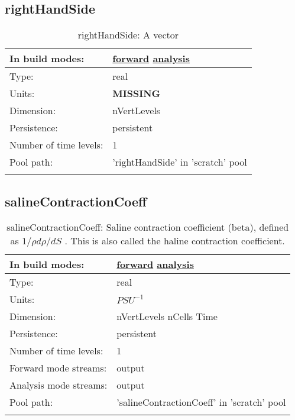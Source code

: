 \subsection[rightHandSide]{rightHandSide}
\label{subsec:var_sec_scratch_rightHandSide}
\begin{center}
\begin{longtable}{| p{2.0in} | p{4.0in} |}
        \hline 
        In build modes: & \hyperref[subsec:forward_var_tab_scratch]{forward} \hyperref[subsec:analysis_var_tab_scratch]{analysis} \\
        \hline 
        Type: & real \\
        \hline 
        Units: & {\bf \color{red} MISSING} \\
        \hline 
        Dimension: & nVertLevels \\
        \hline 
        Persistence: & persistent \\
        \hline 
        Number of time levels: & 1 \\
        \hline 
            Pool path: & 'rightHandSide' in 'scratch' pool
 \\
		 \hline 
    \caption{rightHandSide: A vector}
\end{longtable}
\end{center}
\subsection[salineContractionCoeff]{salineContractionCoeff}
\label{subsec:var_sec_scratch_salineContractionCoeff}
\begin{center}
\begin{longtable}{| p{2.0in} | p{4.0in} |}
        \hline 
        In build modes: & \hyperref[subsec:forward_var_tab_scratch]{forward} \hyperref[subsec:analysis_var_tab_scratch]{analysis} \\
        \hline 
        Type: & real \\
        \hline 
        Units: & $PSU^{-1}$ \\
        \hline 
        Dimension: & nVertLevels nCells Time \\
        \hline 
        Persistence: & persistent \\
        \hline 
        Number of time levels: & 1 \\
        \hline 
		 Forward mode streams: &  output \\
        \hline 
		 Analysis mode streams: &  output \\
        \hline 
            Pool path: & 'salineContractionCoeff' in 'scratch' pool
 \\
		 \hline 
    \caption{salineContractionCoeff:  Saline contraction coefficient (beta), defined as  $1/\rho d\rho/dS$ . This is also called the haline contraction coefficient.}
\end{longtable}
\end{center}

